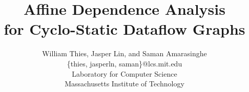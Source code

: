 \documentclass{sig-alternate}
\title{Affine Dependence Analysis \\ for Cyclo-Static Dataflow Graphs}
\author{
\alignauthor \vspace{-18pt}
William Thies,
Jasper Lin,
and Saman Amarasinghe \\
	\vspace{8pt}
	\{thies, jasperln, saman\}@lcs.mit.edu \\
	\vspace{8pt}
	Laboratory for Computer Science \\
	Massachusetts Institute of Technology}
\begin{document}
\newtheorem{definition}{Definition}

\maketitle


  \newcommand{\mt}[1]{\mbox{\it #1}}
  \newcommand{\todo}[1]{\framebox{\bf #1}}
  \newcommand{\dep}[0]{Dependence Frontier}                %
  \newcommand{\DP}[0]{\textsc{Frontier}}                   %
  \newcommand{\DEP}[2]{\DP_{#1 \small{\rightarrow} #2}}    %
  \newcommand{\sssection}[1]{\medskip \noindent {\bf #1} \smallskip}

  \begin{abstract}
    
  \end{abstract}

  
  
  
  
  
  
  
  

  
  

  
  
\end{document}
